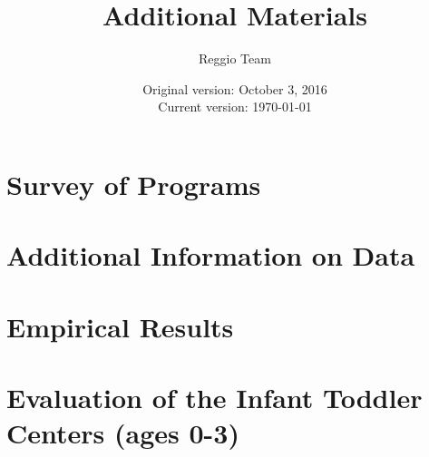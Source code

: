 






\title{\Large \textbf{Additional Materials}}
\author{\normalsize Reggio Team}
\date{\normalsize Original version: October 3, 2016 \\ Current version: \today}
\maketitle

\tableofcontents

\doublespacing

\begin{appendices}

\section{Survey of Programs}
\label{sec:survey}


\section{Additional Information on Data}
\label{sec:data}


\section{Empirical Results}
\label{sec:results}


\section{Evaluation of the Infant Toddler Centers (ages 0-3)} \label{sec:ITC}

\label{sec:asilo_results}


%

\end{appendices}





